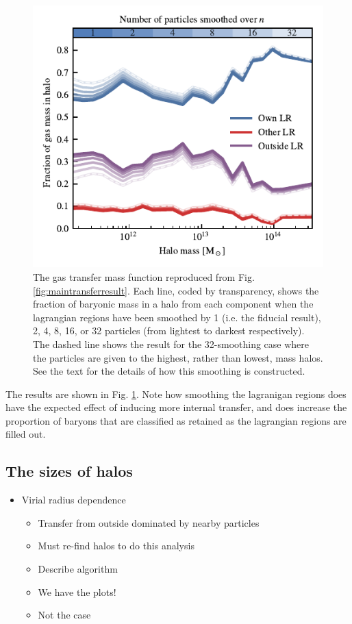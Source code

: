 \begin{figure}
	\centering
	\includegraphics{figures/convergence_smoothing.pdf}
	\vspace{-0.7cm}
	\caption{The gas transfer mass function reproduced from Fig.
		\ref{fig:maintransferresult}. Each line, coded by transparency,
		shows the fraction of baryonic mass in a halo from each component
		when the lagrangian regions have been smoothed by 1 (i.e. the fiducial result), 2, 4, 8, 16,
		or 32 particles (from lightest to darkest respectively). The dashed
		line shows the result for the 32-smoothing case where the particles are
		given to the highest, rather than lowest, mass halos. See the
		text for the details of how this smoothing is constructed.
	}
	\label{fig:smoothconv}
\end{figure}

The results are shown in Fig. \ref{fig:smoothconv}. Note how smoothing the
lagranigan regions does have the expected effect of inducing more internal
transfer, and does increase the proportion of baryons that are classified
as retained as the lagrangian regions are filled out.

\subsection{The sizes of halos}


\begin{itemize}
	\item Virial radius dependence
		\begin{itemize}
			\item Transfer from outside dominated by nearby particles
			\item Must re-find halos to do this analysis
			\item Describe algorithm
			\item We have the plots!
			\item Not the case
		\end{itemize}
\end{itemize}
